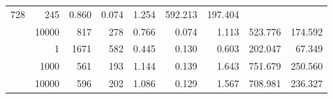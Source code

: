 \begin{table}
\begin{tabular}{rrrrrrrrr}
							     728  & 245  
	                           & 0.860 & 0.074 & 1.254
	                           & 592.213 & 197.404  \\
	                
	            
					 &  
					 
					\multirow{ 1 }{*}{ 10000 } &
					
						
							    
							     817  & 278  
	                           & 0.766 & 0.074 & 1.113
	                           & 523.776 & 174.592  \\
	                
	            
	        
				\noalign{\smallskip}\hline
				\multirow{ 3 }{*}{ 2000000 } &
				
					
					 
					\multirow{ 1 }{*}{ 1 } &
					
						
							    
							     1671  & 582  
	                           & 0.445 & 0.130 & 0.603
	                           & 202.047 & 67.349  \\
	                
	            
					 &  
					 
					\multirow{ 1 }{*}{ 1000 } &
					
						
							    
							     561  & 193  
	                           & 1.144 & 0.139 & 1.643
	                           & 751.679 & 250.560  \\
	                
	            
					 &  
					 
					\multirow{ 1 }{*}{ 10000 } &
					
						
							    
							     596  & 202  
	                           & 1.086 & 0.129 & 1.567
	                           & 708.981 & 236.327  \\
	                
	            
	        

\hline

\end{tabular}
\end{table}
\clearpage


	    

